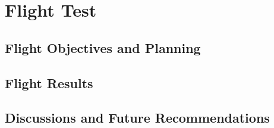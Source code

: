 \newpage
\chapter{Flight Test}
\label{chap:flight_test}

\section{Flight Objectives and Planning}

\section{Flight Results}

\section{Discussions and Future Recommendations}

